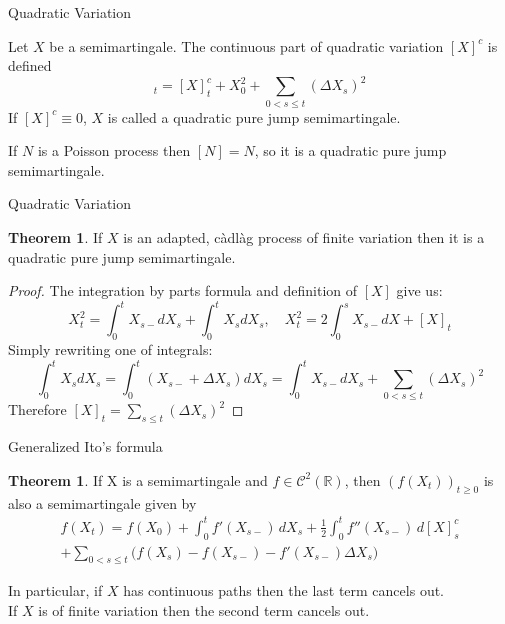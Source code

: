 \documentclass{beamer}%
\theoremstyle{definition}
\newtheorem{mytheor}[theorem]{Theorem}
\begin{document}
\begin{frame}{Quadratic Variation}
    \begin{definition}
        Let $X$ be a semimartingale. The continuous part of quadratic variation $[X]^c$ is defined
        \begin{equation*}
            [X]_t = [X]_t^c + X_0^2 + \sum_{0<s\leq t} (\Delta X_s)^2
        \end{equation*}
        If $[X]^c \equiv 0$, $X$ is called a quadratic pure jump semimartingale.
    \end{definition}
    \begin{example}
        If $N$ is a Poisson process then $[N] = N$, so it is a quadratic pure jump semimartingale.
    \end{example}
\end{frame}
\begin{frame}{Quadratic Variation}
    \begin{mytheor}
        If $X$ is an adapted, càdlàg process of finite variation then it is a quadratic pure jump semimartingale.
    \end{mytheor}
    \begin{proof}[Proof]
        The integration by parts formula and definition of $[X]$ give us:
        \begin{equation*}
            X^2_t = \int_0^t X_{s-} dX_s + \int_0^t X_s dX_s, \quad X^2_t = 2 \int_0^s X_{s-} dX + [X]_t
        \end{equation*}
        Simply rewriting one of integrals:
        \begin{equation*}
            \int_0^t X_s dX_s = \int_0^t (X_{s-} + \Delta X_s) dX_s = \int_0^t X_{s-} dX_s + \sum_{0 < s \leq t}(\Delta X_s)^2
        \end{equation*}
     Therefore $[X]_t = \sum_{s \leq t} (\Delta X_s)^2$ 
    \end{proof}
\end{frame}
\begin{frame}{Generalized Ito's formula}
    \begin{mytheor}
        If X is a semimartingale and $f \in \mathcal{C}^2(\mathbb{R})$, then $(f(X_t))_{t \geq 0}$ is also a semimartingale given by
        \begin{gather*}
            f(X_t) = f(X_0) + \int_0^t f' (X_{s-})\, dX_s + \frac{1}{2} \int_0^t f{''}(X_{s-})\, d [X]^c_s \\ + \sum_{0 < s \leq t}\bigg(f(X_s) - f(X_{s-})- f' (X_{s-})\Delta X_s\bigg)
        \end{gather*}
    \end{mytheor}
    In particular, if $X$ has continuous paths then the last term cancels out. \\ If $X$ is of finite variation then the second term cancels out.
\end{frame}
\end{document}
